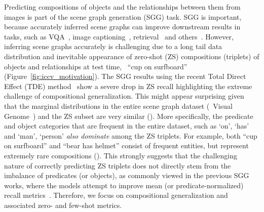Predicting compositions of objects and the relationships between them from images is part of the scene graph generation (SGG) task. SGG is important, because accurately inferred scene graphs can improve downstream results in tasks, such as VQA~\citep{zhang2019empirical,NSM2019,cangea2019videonavqa,lee2019visual,shi2019explainable,hildebrandt2020scene,damodaran2021understanding}, image captioning~\citep{yang2019auto, gu2019unpaired,li2019know,wang2019role,milewski2020scene}, retrieval~\citep{johnson2015image,belilovsky2017joint,tang2020unbiased,tripathi2019compact,schroeder2020structured} and others~\citep{agarwal2020visual,xu2020survey}.
However, inferring scene graphs accurately is challenging due to a long tail data distribution and inevitable appearance of zero-shot (ZS) compositions (triplets) of objects and relationships at test time, \eg~``cup on surfboard''
(Figure~\ref{fig:iccv_motivation}).
The SGG results using the recent Total Direct Effect (TDE) method~\citep{tang2020unbiased} show a severe drop in ZS recall highlighting the extreme challenge of compositional generalization. This might appear surprising given that the marginal distributions in the entire scene graph dataset (\eg~Visual Genome~\citep{krishna2017visual}) and the ZS subset are very similar (\fig{\ref{fig:predicates}}). More specifically, the predicate and object categories that are frequent in the entire dataset, such as `on', `has' and `man', `person' \textit{also dominate} among the ZS triplets. For example, both ``cup on surfboard'' and ``bear has helmet'' consist of frequent entities, but represent extremely rare compositions (\fig{\ref{fig:iccv_motivation}}). 
This strongly suggests that the challenging nature of correctly predicting ZS triplets does not directly stem from the imbalance of predicates (or objects), as commonly viewed in the previous SGG works, where the models attempt to improve mean (or predicate-normalized) recall metrics~\citep{chen2019knowledge, dornadula2019visual,tang2019learning,zhang2019graphical,tang2020unbiased,chen2019scene,zareian2020bridging,lin2020gps,zareian2020learning,yan2020pcpl}.
Therefore, we focus on compositional generalization and associated zero- and few-shot metrics.


